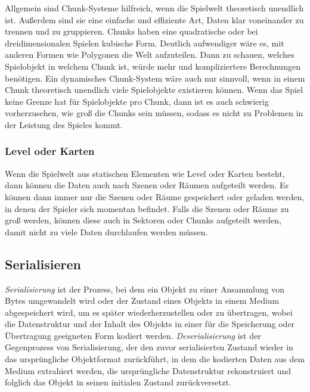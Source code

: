 Allgemein sind Chunk-Systeme hilfreich, wenn die Spielwelt theoretisch unendlich ist. Außerdem sind sie eine einfache und effiziente Art, Daten klar voneinander zu trennen und zu gruppieren. Chunks haben eine quadratische oder bei dreidimensionalen Spielen kubische Form. Deutlich aufwendiger wäre es, mit anderen Formen wie Polygonen die Welt aufzuteilen. Dann zu schauen, welches Spielobjekt in welchem Chunk ist, würde mehr und kompliziertere Berechnungen benötigen. Ein dynamisches Chunk-System wäre auch nur sinnvoll, wenn in einem Chunk theoretisch unendlich viele Spielobjekte existieren können. Wenn das Spiel keine Grenze hat für Spielobjekte pro Chunk, dann ist es auch schwierig vorherzusehen, wie groß die Chunks sein müssen, sodass es nicht zu Problemen in der Leistung des Spieles kommt. 

\subsubsection{Level oder Karten}
Wenn die Spielwelt aus statischen Elementen wie Level oder Karten besteht, dann können die Daten auch nach Szenen oder Räumen aufgeteilt werden. Es können dann immer nur die Szenen oder Räume gespeichert oder geladen werden, in denen der Spieler sich momentan befindet. Falls die Szenen oder Räume zu groß werden, können diese auch in Sektoren oder Chunks aufgeteilt werden, damit nicht zu viele Daten durchlaufen werden müssen.    


\subsection{Serialisieren}

\textit{Serialisierung} ist der Prozess, bei dem ein Objekt zu einer Ansammlung von Bytes umgewandelt wird oder der Zustand eines Objekts in einem Medium abgespeichert wird, um es später wiederherzustellen oder zu übertragen, wobei die Datenstruktur und der Inhalt des Objekts in einer für die Speicherung oder Übertragung geeigneten Form kodiert werden. \textit{Deserialisierung} ist der Gegenprozess von Serialisierung, der den zuvor serialisierten Zustand wieder in das ursprüngliche Objektformat zurückführt, in dem die kodierten Daten aus dem Medium extrahiert werden, die ursprüngliche Datenstruktur rekonstruiert und folglich das Objekt in seinen initialen Zustand zurückversetzt.\cite{codeguruWorkingWith}

